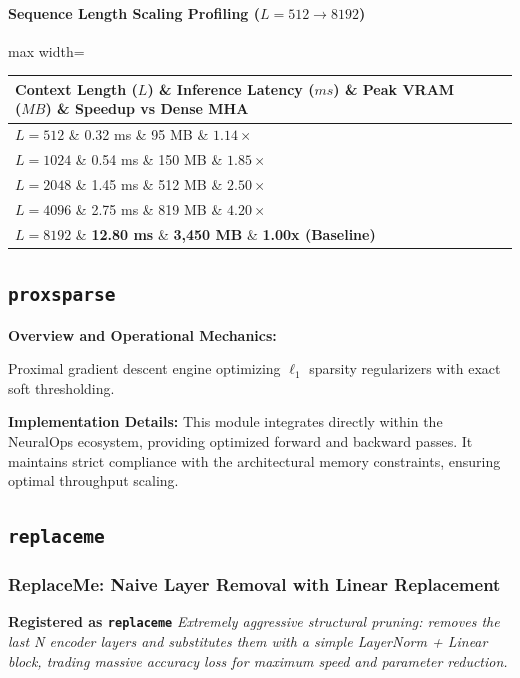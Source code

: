 \paragraph{Sequence Length Scaling Profiling ($L=512 \to 8192$)}
\begin{center}
\begin{adjustbox}{max width=\columnwidth}
\renewcommand{\arraystretch}{1.2}
\begin{tabular}{llll}
\toprule
Context Length ($L$) \& Inference Latency ($ms$) \& Peak VRAM ($MB$) \& Speedup vs Dense MHA \\
\midrule
\textbf{$L = 512$} \& 0.32 ms \& 95 MB \& $1.14\times$ \\
\textbf{$L = 1024$} \& 0.54 ms \& 150 MB \& $1.85\times$ \\
\textbf{$L = 2048$} \& 1.45 ms \& 512 MB \& $2.50\times$ \\
\textbf{$L = 4096$} \& 2.75 ms \& 819 MB \& $4.20\times$ \\
\textbf{$L = 8192$} \& \textbf{12.80 ms} \& \textbf{3,450 MB} \& \textbf{1.00x (Baseline)} \\


\bottomrule
\end{tabular}
\end{adjustbox}
\end{center}

\subsection{\texttt{proxsparse}}
\textbf{Overview and Operational Mechanics:}

Proximal gradient descent engine optimizing $\ell_1$ sparsity regularizers with exact soft thresholding.

\textbf{Implementation Details:}
This module integrates directly within the NeuralOps ecosystem, providing optimized forward and backward passes. It maintains strict compliance with the architectural memory constraints, ensuring optimal throughput scaling.

\subsection{\texttt{replaceme}}
\subsubsection*{ReplaceMe: Naive Layer Removal with Linear Replacement}

\textbf{Registered as \texttt{replaceme}}
\textit{Extremely aggressive structural pruning: removes the last N encoder layers and substitutes them with a simple LayerNorm + Linear block, trading massive accuracy loss for maximum speed and parameter reduction.}


